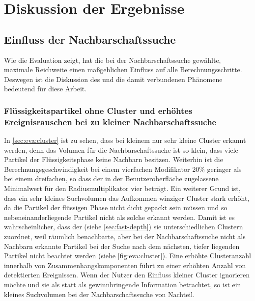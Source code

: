 
\chapter{Diskussion der Ergebnisse}\label{sec:diskussion}

\section{Einfluss der Nachbarschaftssuche}\label{sec:eva:nachbarschaftssuche}

Wie die Evaluation zeigt, hat die bei der Nachbarschaftssuche gewählte, maximale Reichweite einen maßgeblichen Einfluss auf alle Berechnungsschritte. Deswegen ist die Diskussion des   und die damit verbundenen Phänomene bedeutend für diese Arbeit.

\subsection*{Flüssigkeitspartikel ohne Cluster und erhöhtes Ereignisrauschen bei zu kleiner Nachbarschaftssuche}
In \autoref{sec:eva:cluster} ist zu sehen, dass bei kleinem  nur sehr kleine Cluster erkannt werden, denn das Volumen für die Nachbarschaftssuche ist so klein, dass viele Partikel der Flüssigkeitsphase keine Nachbarn besitzen. Weiterhin ist die Berechnungsgeschwindigkeit bei einem vierfachen Modifikator 20\% geringer als bei einem dreifachen, so dass der in der Benutzeroberfläche zugelassene Minimalwert für den Radiusmultiplikator vier beträgt. Ein weiterer Grund ist, dass ein sehr kleines Suchvolumen das Aufkommen winziger Cluster stark erhöht, da die Partikel der flüssigen Phase nicht dicht gepackt sein müssen und so nebeneinanderliegende Partikel nicht als solche erkannt werden. 
Damit ist es wahrscheinlicher, dass der \CFD (siehe \autoref{sec:fast-depth}) sie unterschiedlichen Clustern zuordnet, weil räumlich benachbarte, aber bei der Nachbarschaftssuche nicht als Nachbarn erkannte Partikel bei der Suche nach dem nächsten, tiefer liegenden Partikel nicht beachtet werden (siehe \autoref{fig:eva:cluster}). Eine erhöhte Clusteranzahl innerhalb von Zusammenhangskomponenten führt zu einer erhöhten Anzahl von detektierten Ereignissen. Wenn der Nutzer den Einfluss kleiner Cluster ignorieren möchte und sie als  statt als gewinnbringende Information betrachtet, so ist ein kleines Suchvolumen bei der Nachbarschaftssuche von Nachteil.


